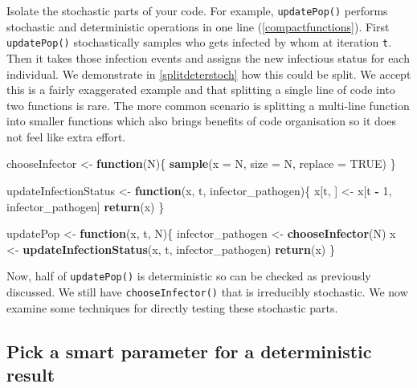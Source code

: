 \documentclass[]{elsarticle} %
\newenvironment{Shaded}{\begin{snugshade}}{\end{snugshade}}
\newcommand{\ControlFlowTok}[1]{\textcolor[rgb]{0.13,0.29,0.53}{\textbf{#1}}}
\newcommand{\DataTypeTok}[1]{\textcolor[rgb]{0.13,0.29,0.53}{#1}}
\newcommand{\DecValTok}[1]{\textcolor[rgb]{0.00,0.00,0.81}{#1}}
\newcommand{\KeywordTok}[1]{\textcolor[rgb]{0.13,0.29,0.53}{\textbf{#1}}}
\newcommand{\NormalTok}[1]{#1}
\newcommand{\OperatorTok}[1]{\textcolor[rgb]{0.81,0.36,0.00}{\textbf{#1}}}
\newcommand{\OtherTok}[1]{\textcolor[rgb]{0.56,0.35,0.01}{#1}}
\newcommand{\StringTok}[1]{\textcolor[rgb]{0.31,0.60,0.02}{#1}}
\begin{document}
Isolate the stochastic parts of your code.
For example, \texttt{updatePop()} performs stochastic and deterministic operations in one line (\ref{compactfunctions}).
First \texttt{updatePop()} stochastically samples who gets infected by whom at iteration \texttt{t}.
Then it takes those infection events and assigns the new infectious status for each individual.
We demonstrate in \ref{splitdeterstoch} how this could be split.
We accept this is a fairly exaggerated example and that splitting a single line of code into two functions is rare.
The more common scenario is splitting a multi-line function into smaller functions which also brings benefits of code organisation so it does not feel like extra effort.
\newline
{}\label{splitdeterstoch}

\begin{Shaded}
\begin{Highlighting}[]
\NormalTok{chooseInfector <-}\StringTok{ }\ControlFlowTok{function}\NormalTok{(N)\{}
  \KeywordTok{sample}\NormalTok{(}\DataTypeTok{x =}\NormalTok{ N, }\DataTypeTok{size =}\NormalTok{ N, }\DataTypeTok{replace =} \OtherTok{TRUE}\NormalTok{)}
\NormalTok{\}}

\NormalTok{updateInfectionStatus <-}\StringTok{ }\ControlFlowTok{function}\NormalTok{(x, t, infector_pathogen)\{}
\NormalTok{  x[t, ] <-}\StringTok{ }\NormalTok{x[t }\OperatorTok{-}\StringTok{ }\DecValTok{1}\NormalTok{, infector_pathogen]}
  \KeywordTok{return}\NormalTok{(x)}
\NormalTok{\}}

\NormalTok{updatePop <-}\StringTok{ }\ControlFlowTok{function}\NormalTok{(x, t, N)\{}
\NormalTok{  infector_pathogen <-}\StringTok{ }\KeywordTok{chooseInfector}\NormalTok{(N)}
\NormalTok{  x <-}\StringTok{ }\KeywordTok{updateInfectionStatus}\NormalTok{(x, t, infector_pathogen)}
  \KeywordTok{return}\NormalTok{(x)}
\NormalTok{\}}
\end{Highlighting}
\end{Shaded}

Now, half of \texttt{updatePop()} is deterministic so can be checked as previously discussed.
We still have \texttt{chooseInfector()} that is irreducibly stochastic.
We now examine some techniques for directly testing these stochastic parts.

\hypertarget{deterministicparams}{%
\subsection*{Pick a smart parameter for a deterministic result}\label{deterministicparams}}
\end{document}
